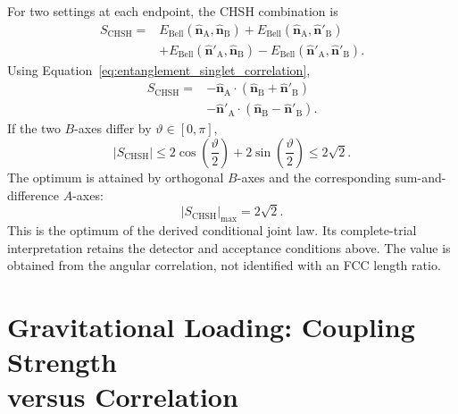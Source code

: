 For two settings at each endpoint, the CHSH combination \cite{CHSH_1969} is
\begin{equation}
    \begin{aligned}
    S_{\mathrm{CHSH}}={}&
      E_{\mathrm{Bell}}(\widehat{\mathbf n}_{\mathrm A},\widehat{\mathbf n}_{\mathrm B})
      +E_{\mathrm{Bell}}(\widehat{\mathbf n}_{\mathrm A},\widehat{\mathbf n}'_{\mathrm B})\\
      &+E_{\mathrm{Bell}}(\widehat{\mathbf n}'_{\mathrm A},\widehat{\mathbf n}_{\mathrm B})
      -E_{\mathrm{Bell}}(\widehat{\mathbf n}'_{\mathrm A},\widehat{\mathbf n}'_{\mathrm B}).
    \end{aligned}
    \label{eq:entanglement_chsh_definition}
\end{equation}
Using Equation~\eqref{eq:entanglement_singlet_correlation},
\begin{equation}
    \begin{aligned}
    S_{\mathrm{CHSH}}={}&
      -\widehat{\mathbf n}_{\mathrm A}\cdot
       (\widehat{\mathbf n}_{\mathrm B}+\widehat{\mathbf n}'_{\mathrm B})\\
      &-\widehat{\mathbf n}'_{\mathrm A}\cdot
       (\widehat{\mathbf n}_{\mathrm B}-\widehat{\mathbf n}'_{\mathrm B}).
    \end{aligned}
\end{equation}
If the two $B$-axes differ by $\vartheta\in[0,\pi]$,
\begin{equation}
    |S_{\mathrm{CHSH}}|
    \leq2\cos\!\left(\frac{\vartheta}{2}\right)
        +2\sin\!\left(\frac{\vartheta}{2}\right)
    \leq2\sqrt2.
\end{equation}
The optimum is attained by orthogonal $B$-axes and the corresponding sum-and-difference $A$-axes:
\begin{equation}
    \boxed{|S_{\mathrm{CHSH}}|_{\max}=2\sqrt2}.
    \label{eq:entanglement_tsirelson}
\end{equation}
This is the optimum of the derived conditional joint law. Its complete-trial interpretation retains the detector and acceptance conditions above. The value is obtained from the angular correlation, not identified with an FCC length ratio.

\section[Gravitational Loading: Coupling Strength versus Correlation]{Gravitational Loading: Coupling Strength\\versus Correlation}
\label{sec:entanglement_gravity_status}

